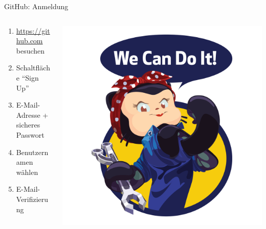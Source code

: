 \documentclass[compress,aspectratio=169]{beamer}
\begin{document}
	\begin{frame}{GitHub: Anmeldung}
		\begin{columns}
			\begin{column}{0.5\textwidth}
				\begin{enumerate}
					\item \url{https://github.com} besuchen
					\item Schaltfläche ``Sign Up''
					\item E-Mail-Adresse + sicheres Passwort
					\item Benutzernamen wählen
					\item E-Mail-Verifizierung
				\end{enumerate}
			\end{column}
			\begin{column}{0.5\textwidth}
				\includegraphics[width=\textwidth]{assets/we-can-do-it.png}
			\end{column}
		\end{columns}
	\end{frame}
\end{document}
